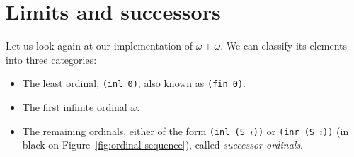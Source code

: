 

  




  




%



\section{Limits and successors}

Let us look again at our implementation of $\omega+\omega$. We can classify its elements into three categories:

\begin{itemize}
\item The least ordinal, \texttt{(inl 0)}, also known as  \texttt{(fin 0)}.
\item The first infinite ordinal $\omega$.
\item The remaining ordinals, either of the form \texttt{(inl (S $i$))} or \texttt{(inr (S $i$))} (in black on Figure~\ref{fig:ordinal-sequence}), called \emph{successor ordinals}.
\end{itemize}

